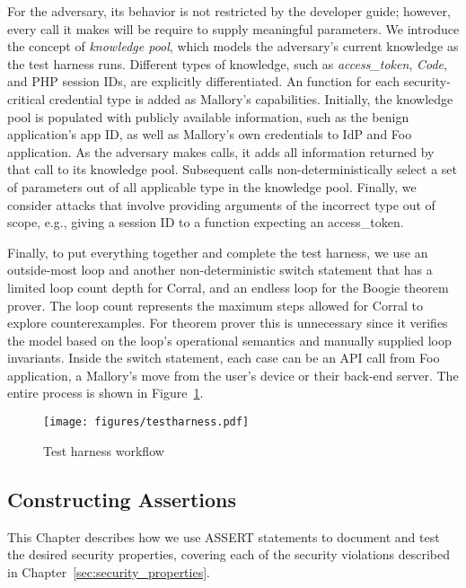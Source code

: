   For the adversary, its behavior is not restricted by the developer guide; however, every call it makes will be require to supply meaningful parameters.  We introduce the concept of \emph{knowledge pool}, which models the adversary's current knowledge as the test harness runs.  Different types of knowledge, such as \emph{access\_token}, \emph{Code}, and PHP session IDs, are explicitly differentiated.  An  function for each security-critical credential type is added as Mallory's capabilities.  Initially, the knowledge pool is populated with publicly available information, such as the benign application's app ID, as well as Mallory's own credentials to IdP and Foo application.  As the adversary makes calls, it adds all information returned by that call to its knowledge pool.  Subsequent calls non-deterministically select a set of parameters out of all applicable type in the knowledge pool.  Finally, we consider attacks that involve providing arguments of the incorrect type out of scope, e.g., giving a session ID to a function expecting an access\_token.

  Finally, to put everything together and complete the test harness, we use an outside-most loop and another non-deterministic switch statement that has a limited loop count depth for Corral, and an endless loop for the Boogie theorem prover.  The loop count represents the maximum steps allowed for Corral to explore counterexamples.  For theorem prover this is unnecessary since it verifies the model based on the loop's operational semantics and manually supplied loop invariants.  Inside the switch statement, each case can be an API call from Foo application, a Mallory's move from the user's device or their back-end server.  The entire process is shown in Figure~\ref{fig:testharness}.

\begin{figure}[hbt]
\centering
\texttt{[image: figures/testharness.pdf]}
\caption{Test harness workflow}
\label{fig:testharness}
\end{figure}

\subsection{Constructing Assertions}
This Chapter describes how we use ASSERT statements to document and test the desired security properties, covering each of the security violations described in Chapter~\ref{sec:security_properties}. 

